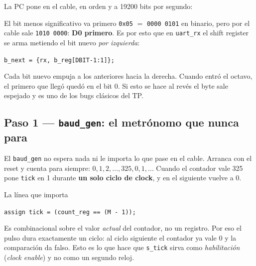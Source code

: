 \documentclass[11pt,a4paper]{article}
\newcommand{\sg}[1]{\texttt{\small #1}}
\begin{document}
La PC pone en el cable, en orden y a 19200 bits por segundo:

\vspace{4pt}
\begin{center}
\end{center}

\begin{ojo}{El bit menos significativo va primero}
\texttt{0x05} $=$ \texttt{0000\,0101} en binario, pero por el cable sale
\texttt{1010\,0000}: \textbf{D0 primero}. Es por esto que en \sg{uart\_rx} el
shift register se arma metiendo el bit nuevo \emph{por izquierda}:
\begin{center}\sg{b\_next = \{rx, b\_reg[DBIT-1:1]\};}\end{center}
Cada bit nuevo empuja a los anteriores hacia la derecha. Cuando entr\'o el octavo,
el primero que lleg\'o qued\'o en el bit 0. Si esto se hace al rev\'es el byte sale
espejado y es uno de los bugs cl\'asicos del TP.
\end{ojo}

\subsection{Paso 1 --- \texttt{baud\_gen}: el metr\'onomo que nunca para}

El \sg{baud\_gen} no espera nada ni le importa lo que pase en el cable. Arranca
con el reset y cuenta para siempre: $0, 1, 2, \dots, 325, 0, 1, \dots$ Cuando el
contador vale 325 pone \sg{tick} en 1 durante \textbf{un solo ciclo de clock}, y
en el siguiente vuelve a 0.

\begin{ficha}{La l\'inea que importa}
\begin{center}\sg{assign tick = (count\_reg == (M - 1));}\end{center}
Es combinacional sobre el valor \emph{actual} del contador, no un registro. Por eso
el pulso dura exactamente un ciclo: al ciclo siguiente el contador ya vale 0 y la
comparaci\'on da falso. Esto es lo que hace que \sg{s\_tick} sirva como
\emph{habilitaci\'on} (\emph{clock enable}) y no como un segundo reloj.
\end{ficha}
\end{document}
